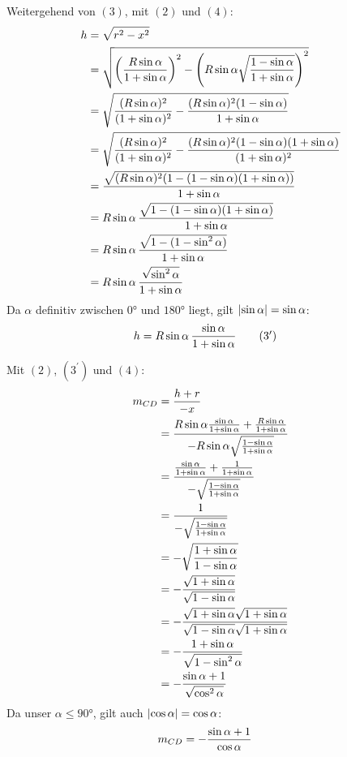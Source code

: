 \begin{samepage}
	Weitergehend von $(3)$, mit $(2)$ und $(4)$: \nopagebreak
	\begin{align*}
		h &= \sqrt{r^2-x^2} \\
		&= \sqrt{\left(\frac{R\sin\alpha}{1+\sin\alpha}\right)^2 - \left(R\sin\alpha\sqrt{\frac{1-\sin\alpha}{1+\sin\alpha}}\right)^2} \\
		&= \sqrt{\frac{(R\sin\alpha)^2}{(1+\sin\alpha)^2} - \frac{(R\sin\alpha)^2(1-\sin\alpha)}{1+\sin\alpha}} \\
		&= \sqrt{\frac{(R\sin\alpha)^2}{(1+\sin\alpha)^2} - \frac{(R\sin\alpha)^2(1-\sin\alpha)(1+\sin\alpha)}{(1+\sin\alpha)^2}} \\
		&= \frac{\sqrt{(R\sin\alpha)^2(1-(1-\sin\alpha)(1+\sin\alpha))}}{1+\sin\alpha} \\
		&= R\sin\alpha \, \frac{\sqrt{1-(1-\sin\alpha)(1+\sin\alpha)}}{1+\sin\alpha} \\
		&= R\sin\alpha \, \frac{\sqrt{1-(1-\sin^2\alpha)}}{1+\sin\alpha} \\
		&= R\sin\alpha \, \frac{\sqrt{\sin^2\alpha}}{1+\sin\alpha}
	\end{align*}
	Da $\alpha$ definitiv zwischen $\ang{0}$ und $\ang{180}$ liegt, gilt $\left|\sin\alpha\right| = \sin\alpha$:
	\begin{align*}
		h &= R\sin\alpha \, \frac{\sin\alpha}{1+\sin\alpha} \tag{$3^\prime$}
	\end{align*}
\end{samepage}
Mit $(2)$, $(3^\prime)$ und $(4)$: \nopagebreak
\begin{align*}
	m_{CD} &= \frac{h+r}{-x} \\
	&= \frac{R\sin\alpha \frac{\sin\alpha}{1+\sin\alpha} + \frac{R\sin\alpha}{1+\sin\alpha}}{-R\sin\alpha\sqrt{\frac{1-\sin\alpha}{1+\sin\alpha}}} \\
	&= \frac{\frac{\sin\alpha}{1+\sin\alpha}+\frac{1}{1+\sin\alpha}}{-\sqrt{\frac{1-\sin\alpha}{1+\sin\alpha}}} \\
	&= \frac{1}{-\sqrt{\frac{1-\sin\alpha}{1+\sin\alpha}}} \\
	&= -\sqrt{\frac{1+\sin\alpha}{1-\sin\alpha}} \\
	&= -\frac{\sqrt{1+\sin\alpha}}{\sqrt{1-\sin\alpha}} \\
	&= -\frac{\sqrt{1+\sin\alpha}\sqrt{1+\sin\alpha}}{\sqrt{1-\sin\alpha}\sqrt{1+\sin\alpha}} \\
	&= -\frac{1+\sin\alpha}{\sqrt{1 - \sin^2\alpha}} \\
	&= -\frac{\sin\alpha+1}{\sqrt{\cos^2\alpha}}
\end{align*}
Da unser $\alpha \leq \ang{90}$, gilt auch $\left|\cos\alpha\right| = \cos\alpha$:
\begin{align*}
	m_{CD} &= -\frac{\sin\alpha+1}{\cos\alpha}
\end{align*}
\goodbreak
